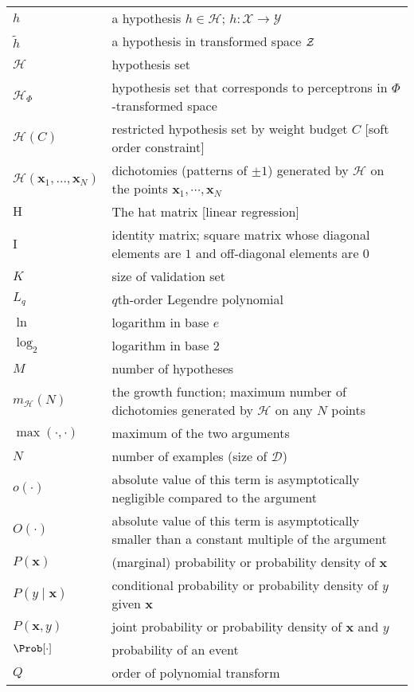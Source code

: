 \documentclass[10pt]{book}
\begin{document}
\begin{longtable}{lp{4.5in}}
${h}$ & a hypothesis ${h}\in{\mathcal{H}}$; ${h}\colon{\mathcal{X}} \to {\mathcal{Y}}$\\
$\tilde{{h}}$ & a hypothesis in transformed space $\cal Z$\\
${\mathcal{H}}$ & hypothesis set\\
${\mathcal{H}}_\Phi$ & hypothesis set that corresponds to perceptrons in $\Phi$-transformed space\\
${\mathcal{H}}(C)$ & restricted hypothesis set by weight budget $C$ [soft order constraint]\\
${\mathcal{H}}({{\mathbf{x}}}_1,\ldots,{{\mathbf{x}}}_N)$ & dichotomies (patterns of $\pm 1$) generated by ${\mathcal{H}}$ on the points ${{\mathbf{x}}}_1,\cdots,{{\mathbf{x}}}_N$\\
${{\mathrm{H}}}$ & The hat matrix [linear regression]\\
${{\mathrm{I}}}$& identity matrix; square matrix whose diagonal elements are $1$ and off-diagonal elements are $0$\\
$K$ & size of validation set\\
$L_q$ & $q$th-order Legendre polynomial\\
$\ln$& logarithm in  base $e$\\
$\log_2$& logarithm in base $2$\\
$M$ & number of hypotheses\\
$m_{\mathcal{H}}(N)$ & the growth function; maximum number of dichotomies generated by ${\mathcal{H}}$ on any $N$ points\\
$\max(\cdot,\cdot)$ & maximum of the two arguments\\
$N$ & number of examples (size of $\mathcal{D}$)\\
$o(\cdot)$ & absolute value of this term is asymptotically negligible compared to the argument\\
$O(\cdot)$ & absolute value of this term is asymptotically smaller than a constant multiple of the argument\\ 
${P}({{\mathbf{x}}})$ & (marginal) probability or probability density of ${{\mathbf{x}}}$\\
${P}({y} \mid {{\mathbf{x}}})$ & conditional probability or probability density of ${y}$ given ${{\mathbf{x}}}$\\
${P}({{\mathbf{x}}},{y})$ & joint probability or probability density of ${{\mathbf{x}}}$ and ${y}$\\
$\Prob [ \cdot ]$ & probability of an event\\
$Q$ & order of polynomial transform\\

\end{longtable}
\end{document}
